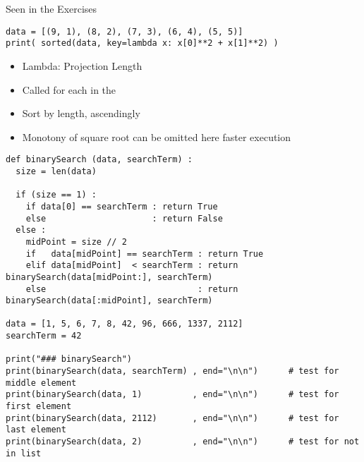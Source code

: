\begin{frame}[fragile]{Seen in the Exercises}
%
\begin{codebox}
\begin{verbatim}
data = [(9, 1), (8, 2), (7, 3), (6, 4), (5, 5)]
print( sorted(data, key=lambda x: x[0]**2 + x[1]**2) )
\end{verbatim}
\end{codebox}
%
\begin{itemize}
\item Lambda: Projection  \thus Length
\item Called for each  in the 
\item Sort by length, ascendingly 
\item Monotony of square root \thus can be omitted here \thus faster execution
\end{itemize}
%
\end{frame}


\begin{frame}[fragile]
%
\begin{codebox}
\begin{verbatim}
def binarySearch (data, searchTerm) :
  size = len(data)
  
  if (size == 1) :
    if data[0] == searchTerm : return True
    else                     : return False
  else :
    midPoint = size // 2
    if   data[midPoint] == searchTerm : return True
    elif data[midPoint]  < searchTerm : return binarySearch(data[midPoint:], searchTerm)
    else                              : return binarySearch(data[:midPoint], searchTerm)

data = [1, 5, 6, 7, 8, 42, 96, 666, 1337, 2112]
searchTerm = 42

print("### binarySearch")
print(binarySearch(data, searchTerm) , end="\n\n")      # test for middle element
print(binarySearch(data, 1)          , end="\n\n")      # test for first element
print(binarySearch(data, 2112)       , end="\n\n")      # test for last element
print(binarySearch(data, 2)          , end="\n\n")      # test for not in list
\end{verbatim}
\end{codebox}
%
\end{frame}

